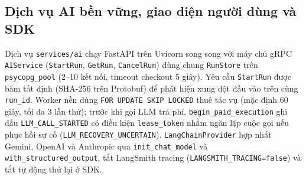 \subsection{Dịch vụ AI bền vững, giao diện người dùng và SDK}
Dịch vụ \texttt{services/ai} chạy FastAPI trên Uvicorn song song với máy chủ gRPC \texttt{AIService} (\texttt{StartRun}, \texttt{GetRun}, \texttt{CancelRun}) dùng chung
\texttt{RunStore} trên \texttt{psycopg\_\hspace{0pt}pool} (2--10 kết nối, timeout checkout 5 giây).
Yêu cầu \texttt{StartRun} được băm tất định (SHA-256 trên Protobuf) để phát hiện xung đột đầu vào trên cùng \texttt{run\_\hspace{0pt}id}.
Worker nền dùng \texttt{FOR UPDATE SKIP LOCKED} thuê tác vụ (mặc định 60 giây, tối đa 3 lần thử); trước khi gọi LLM trả phí, \texttt{begin\_\hspace{0pt}paid\_\hspace{0pt}execution} ghi dấu
\texttt{LLM\_\hspace{0pt}CALL\_\hspace{0pt}STARTED} có điều kiện \texttt{lease\_\hspace{0pt}token} nhằm ngăn lặp cuộc gọi nếu phục hồi sự cố (\texttt{LLM\_\hspace{0pt}RECOVERY\_\hspace{0pt}UNCERTAIN}).
\texttt{LangChainProvider} hợp nhất Gemini, OpenAI và Anthropic qua \texttt{init\_\hspace{0pt}chat\_\hspace{0pt}model} và \texttt{with\_\hspace{0pt}structured\_\hspace{0pt}output}, tắt LangSmith tracing (\texttt{LANGSMITH\_\hspace{0pt}TRACING=false}) và tắt tự động thử lại ở SDK.


